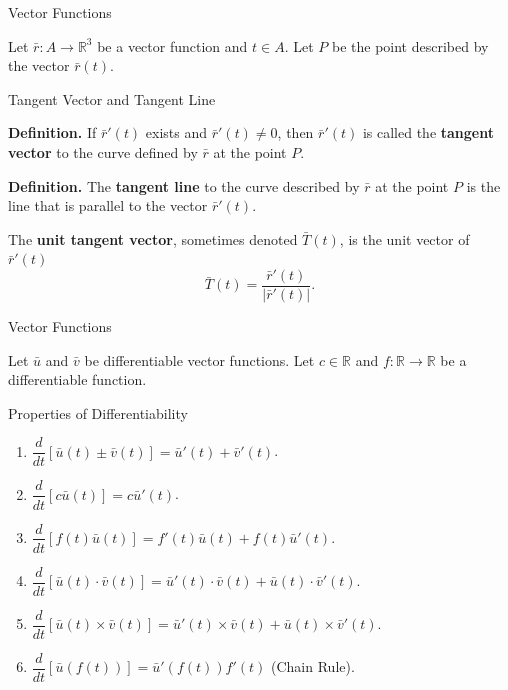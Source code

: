\documentclass[aspectratio=169, UTF8]{ctexbeamer}
\begin{document}
    \begin{frame}[t]{Vector Functions}
        \par Let $\bar{r}: A \to \mathbb{R}^3$ be a vector function and $t \in A$. Let $P$ be the point described by the vector $\bar{r}(t)$.
        \begin{block}{Tangent Vector and Tangent Line}
            \par \textbf{Definition.} If $\bar{r}'(t)$ exists and $\bar{r}'(t) \neq 0$, then $\bar{r}'(t)$ is called the \textbf{tangent vector} to the curve defined by $\bar{r}$ at the point $P$.

            \phantom{zjy}
            
            \par \textbf{Definition.} The \textbf{tangent line} to the curve described by $\bar{r}$ at the point $P$ is the line that is parallel to the vector $\bar{r}'(t)$.
        \end{block}

        \par The \textbf{unit tangent vector}, sometimes denoted $\bar{T}(t)$, is the unit vector of $\bar{r}'(t)$
        \begin{equation*}
            \bar{T} (t) = \dfrac{\bar{r}'(t)}{|\bar{r}'(t)|} .
        \end{equation*}
    \end{frame}

    \begin{frame}[t]{Vector Functions}
        \par Let $\bar{u}$ and $\bar{v}$ be differentiable vector functions. Let $c \in \mathbb{R}$ and $f: \mathbb{R} \to \mathbb{R}$ be a differentiable function.
        \begin{block}{Properties of Differentiability}
            \begin{enumerate}
                \item $\dfrac{d}{dt} [\bar{u} (t) \pm \bar{v} (t)] = \bar{u}'(t) + \bar{v}'(t)$.
                \item $\dfrac{d}{dt} [c \bar{u}(t)] = c \bar{u}'(t)$.
                \item $\dfrac{d}{dt} [ f(t) \bar{u} (t)] = f'(t) \bar{u}(t) + f(t) \bar{u}'(t)$.
                \item $\dfrac{d}{dt} [\bar{u} (t) \cdot \bar{v} (t)] = \bar{u}'(t) \cdot \bar{v}(t) + \bar{u} (t) \cdot \bar{v}'(t)$.
                \item $\dfrac{d}{dt} [\bar{u} (t) \times \bar{v} (t)] = \bar{u}'(t) \times \bar{v}(t) + \bar{u} (t) \times \bar{v}'(t)$.
                \item $\dfrac{d}{dt} [\bar{u} (f(t))] = \bar{u}'(f(t)) f'(t)$ (Chain Rule).
            \end{enumerate}
        \end{block}
    \end{frame}
\end{document}
